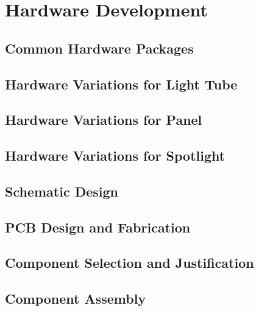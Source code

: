 \section{Hardware Development}
\label{sec:hardware_development}

\subsection{Common Hardware Packages}
\subsection{Hardware Variations for Light Tube}
\subsection{Hardware Variations for Panel}
\subsection{Hardware Variations for Spotlight}
\subsection{Schematic Design}
\subsection{PCB Design and Fabrication}
\subsection{Component Selection and Justification}
\subsection{Component Assembly}